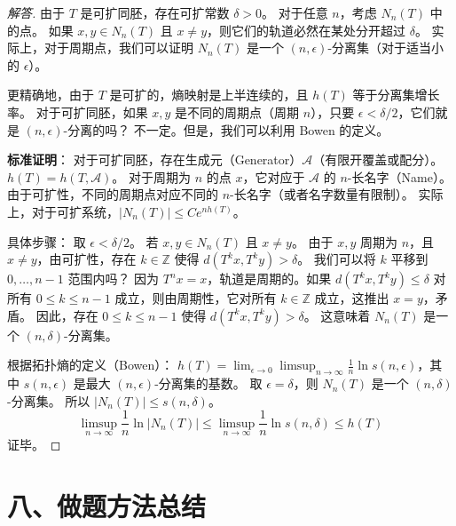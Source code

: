 \documentclass[a4paper,12pt]{article}
\newenvironment{solution}{\begin{proof}[解答]}{\end{proof}}
\begin{document}
\begin{solution}
    由于 $T$ 是可扩同胚，存在可扩常数 $\delta > 0$。
    对于任意 $n$，考虑 $N_n(T)$ 中的点。
    如果 $x, y \in N_n(T)$ 且 $x \neq y$，则它们的轨道必然在某处分开超过 $\delta$。
    实际上，对于周期点，我们可以证明 $N_n(T)$ 是一个 $(n, \epsilon)$-分离集（对于适当小的 $\epsilon$）。
    
    更精确地，由于 $T$ 是可扩的，熵映射是上半连续的，且 $h(T)$ 等于分离集增长率。
    对于可扩同胚，如果 $x, y$ 是不同的周期点（周期 $n$），只要 $\epsilon < \delta/2$，它们就是 $(n, \epsilon)$-分离的吗？
    不一定。但是，我们可以利用 Bowen 的定义。
    
    \textbf{标准证明}：
    对于可扩同胚，存在生成元（Generator）$\mathcal{A}$（有限开覆盖或配分）。
    $h(T) = h(T, \mathcal{A})$。
    对于周期为 $n$ 的点 $x$，它对应于 $\mathcal{A}$ 的 $n$-长名字（Name）。
    由于可扩性，不同的周期点对应不同的 $n$-长名字（或者名字数量有限制）。
    实际上，对于可扩系统，$|N_n(T)| \le C e^{n h(T)}$。
    
    具体步骤：
    取 $\epsilon < \delta/2$。
    若 $x, y \in N_n(T)$ 且 $x \neq y$。
    由于 $x, y$ 周期为 $n$，且 $x \neq y$，由可扩性，存在 $k \in \mathbb{Z}$ 使得 $d(T^k x, T^k y) > \delta$。
    我们可以将 $k$ 平移到 $0, \dots, n-1$ 范围内吗？
    因为 $T^n x = x$，轨道是周期的。如果 $d(T^k x, T^k y) \le \delta$ 对所有 $0 \le k \le n-1$ 成立，则由周期性，它对所有 $k \in \mathbb{Z}$ 成立，这推出 $x=y$，矛盾。
    因此，存在 $0 \le k \le n-1$ 使得 $d(T^k x, T^k y) > \delta$。
    这意味着 $N_n(T)$ 是一个 $(n, \delta)$-分离集。
    
    根据拓扑熵的定义（Bowen）：
    $h(T) = \lim_{\epsilon \to 0} \limsup_{n \to \infty} \frac{1}{n} \ln s(n, \epsilon)$，其中 $s(n, \epsilon)$ 是最大 $(n, \epsilon)$-分离集的基数。
    取 $\epsilon = \delta$，则 $N_n(T)$ 是一个 $(n, \delta)$-分离集。
    所以 $|N_n(T)| \le s(n, \delta)$。
    $$ \limsup_{n\to\infty} \frac{1}{n} \ln |N_n(T)| \le \limsup_{n\to\infty} \frac{1}{n} \ln s(n, \delta) \le h(T) $$
    证毕。
\end{solution}

\section*{八、做题方法总结}
\end{document}
